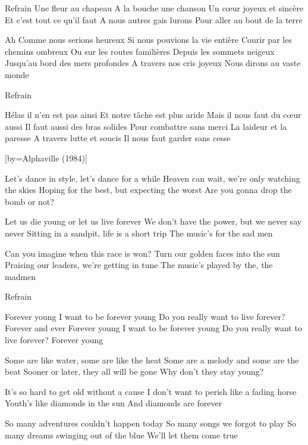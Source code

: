 \beginverse
Refrain
Une fleur au chapeau
A la bouche une chanson
Un cœur joyeux et sincère
Et c'est tout ce qu'il faut
A nous autres gais lurons
Pour aller au bout de la terre
\endverse

\beginverse
Ah \! Comme nous serions heureux
Si nous pouvions la vie entière
Courir par les chemins ombreux
Ou sur les routes familières
Depuis les sommets neigeux
Jusqu'au bord des mers profondes
A travers nos cris joyeux
Nous dirons au vaste monde
\endverse

\beginverse
Refrain
\endverse

\beginverse
Hélas \! il n'en est pas ainsi
Et notre tâche est plus aride
Mais il nous faut du cœur aussi
Il faut aussi des bras solides
Pour combattre sans merci
La laideur et la paresse
A travers lutte et soucis
Il nous faut garder sans cesse
\endverse

[by={Alphaville (1984)}]

\beginverse
Let's dance in style, let's dance for a while
Heaven can wait, we're only watching the skies
Hoping for the best, but expecting the worst
Are you gonna drop the bomb or not?
\endverse

\beginverse
Let us die young or let us live forever
We don't have the power, but we never say never
Sitting in a sandpit, life is a short trip
The music's for the sad men
\endverse

\beginverse
Can you imagine when this race is won?
Turn our golden faces into the sun
Praising our leaders, we're getting in tune
The music's played by the, the madmen
\endverse

\beginverse
Refrain
\endverse

\beginverse
Forever young
I want to be forever young
Do you really want to live forever?
Forever and ever
Forever young
I want to be forever young
Do you really want to live forever?
Forever young
\endverse

\beginverse
Some are like water, some are like the heat
Some are a melody and some are the beat
Sooner or later, they all will be gone
Why don't they stay young?
\endverse

\beginverse
It's so hard to get old without a cause
I don't want to perish like a fading horse
Youth's like diamonds in the sun
And diamonds are forever
\endverse

\beginverse
So many adventures couldn't happen today
So many songs we forgot to play
So many dreams swinging out of the blue
We'll let them come true
\endverse

